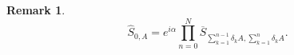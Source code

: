 \documentclass[b5paper,draft,openbib,12pt]{memoir}
\newtheorem{Remark}[Def]{Remark}
\begin{document}
\begin{Remark}

\begin{equation}\label{hat finite spacing}
\hat{S}_{0,A}=e^{i\alpha}\prod_{n=0}^{N} \overline{S}_{\sum_{k=1}^{n-1}\delta_k A,\sum_{k=1}^{n}\delta_kA}.
\end{equation}
\end{Remark}
\end{document}
